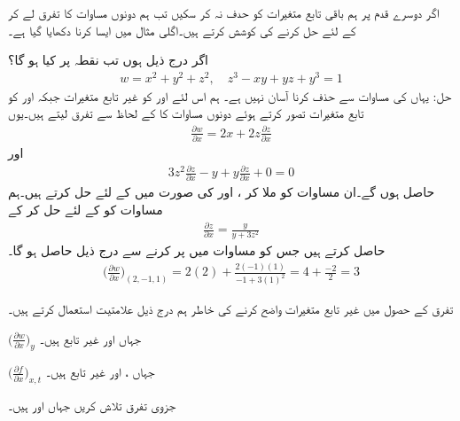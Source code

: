 اگر دوسرے قدم پر ہم باقی تابع متغیرات کو حدف نہ کر  سکیں تب  ہم  دونوں مساوات کا تفرق لے  کر      کے لئے حل کرنے کی کوشش کرتے ہیں۔اگلی مثال میں ایسا کرنا دکھایا گیا ہے۔

اگر درج ذیل ہوں تب نقطہ  پر   کیا ہو گا؟
\begin{align*}
w=x^2+y^2+z^2,\quad z^3-xy+yz+y^3=1
\end{align*}
حل:\quad
یہاں  کی مساوات سے  حذف کرنا  آسان نہیں ہے۔ ہم اس لئے   اور  کو غیر تابع متغیرات  جبکہ  اور  کو تابع متغیرات  تصور کرتے ہوئے دونوں مساوات   کا  کے لحاظ سے تفرق لیتے ہیں۔یوں 
\begin{align}\label{مساوات_کثیرالمتغیر_اصل_الف}
\frac{\partial w}{\partial x}=2x+2z\frac{\partial z}{\partial x}
\end{align}
اور
\begin{align}\label{مساوات_کثیرالمتغیر_اصل_ب}
3z^2\frac{\partial z}{\partial x}-y+y\frac{\partial z}{\partial x}+0=0
\end{align}
حاصل ہوں گے۔ان  مساوات کو   ملا کر ،  اور  کی صورت میں  کے لئے حل کرتے ہیں۔ہم مساوات  کو  کے لئے حل کر  کے
\begin{align*}
\frac{\partial z}{\partial x}=\frac{y}{y+3z^2}
\end{align*}
حاصل کرتے ہیں جس کو مساوات   میں پر کرنے سے درج ذیل حاصل ہو گا۔
\begin{align*}
\big(\frac{\partial w}{\partial x}\big)_{(2,-1,1)}=2(2)+\frac{2(-1)(1)}{-1+3(1)^2}=4+\frac{-2}{2}=3
\end{align*}

تفرق کے حصول میں غیر تابع متغیرات واضح کرنے کی خاطر ہم درج ذیل علامتیت استعمال کرتے ہیں۔
\begin{description}
\item{$\big(\frac{\partial w}{\partial x}\big)_y$}\quad
{} جہاں  اور  غیر تابع ہیں۔
\item{$\big(\frac{\partial f}{\partial x}\big)_{x,t}$}\quad
{} جہاں ،   اور  غیر تابع ہیں۔
\end{description}

جزوی تفرق  تلاش کریں جہاں  اور  ہیں۔

